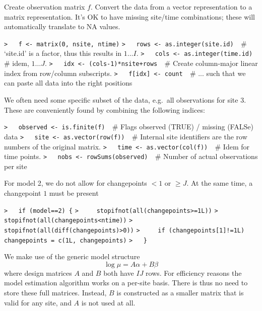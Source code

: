 \documentclass[a4paper]{article}
\begin{document}
Create observation matrix $f$.
Convert the data from a vector representation to a matrix representation.
It's OK to have missing site/time combinations; these will automatically
translate to NA values.\par
\verb~>   f <- matrix(0, nsite, ntime)~\newline
\verb~>   rows <- as.integer(site.id)  ~{\sffamily\# `site.id' is a factor, thus this results in $1\ldots I$.}\newline
\verb~>   cols <- as.integer(time.id)  ~{\sffamily\# idem, $1 \ldots J$.}\newline
\verb~>   idx <- (cols-1)*nsite+rows  ~{\sffamily\# Create column-major linear index from row/column subscripts.}\newline
\verb~>   f[idx] <- count  ~{\sffamily\# ... such that we can paste all data into the right positions}\par

We often need some specific subset of the data, e.g.\ all observations for site 3.
These are conveniently found by combining the following indices:\par
\verb~>   observed <- is.finite(f)  ~{\sffamily\# Flags observed (TRUE) / missing (FALSe) data}\newline
\verb~>   site <- as.vector(row(f))  ~{\sffamily\# Internal site identifiers are the row numbers of the original matrix.}\newline
\verb~>   time <- as.vector(col(f))  ~{\sffamily\# Idem for time points.}\newline
\verb~>   nobs <- rowSums(observed)  ~{\sffamily\# Number of actual observations per site}\par

For model 2, we do not allow for changepoints $<1$ or $\geq J$. At the same time,
a changepoint $1$ must be present\par
\verb~>   if (model==2) {~\newline
\verb~>     stopifnot(all(changepoints>=1L))~\newline
\verb~>     stopifnot(all(changepoints<ntime))~\newline
\verb~>     stopifnot(all(diff(changepoints)>0))~\newline
\verb~>     if (changepoints[1]!=1L) changepoints = c(1L, changepoints)~\newline
\verb~>   }~\par

We make use of the generic model structure
$$ \log\mu = A\alpha + B\beta $$
where design matrices $A$ and $B$ both have $IJ$ rows.
For efficiency reasons the model estimation algorithm works on a per-site basis.
There is thus no need to store these full matrices. Instead, $B$ is constructed as a
smaller matrix that is valid for any site, and $A$ is not used at all.\par
\end{document}
